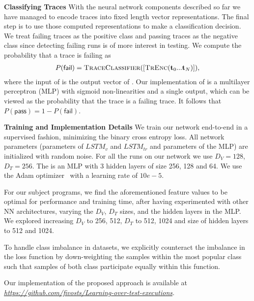 \textbf{Classifying Traces}
With the neural network components described so far we have managed to encode traces into fixed length vector representations. The final step is to use those computed representations to make a classification decision. We treat failing traces as the positive class and passing traces as the negative class since detecting failing runs is of more interest in testing.  We compute the probability that a trace is failing as
\begin{align*}
	P(\textsf{fail}) = \textsc{TraceClassifier}([\textsc{TrEnc}(\mathbf{t}_0 ... \mathbf{t}_N)]),
\end{align*}
where the input of \traceClassifier is the output vector of \traceEncoder. Our implementation of \traceClassifier is a multilayer perceptron (MLP) with sigmoid non-linearities and a single output, which can be viewed as the probability that the trace is a failing trace. It follows that $P(\textsf{pass})=1-P(\textsf{fail})$.

\textbf{Training and Implementation Details}
We train our network end-to-end in a supervised fashion, minimizing the binary cross entropy loss. All network parameters (parameters of $LSTM_v$ and $LSTM_{tr}$ and parameters of the MLP) are initialized with random noise.
For all the runs on our network we use $D_V=128$, $D_T=256$. The \traceClassifier is an MLP with 3 hidden layers of size 256, 128 and 64.
We use the Adam optimizer~\cite{AdamOptimizer} with a learning rate of $10e-5$. 

For our subject programs, we find the aforementioned feature values to be optimal for performance and training time, after having experimented with other NN architectures, varying the $D_V$, $D_T$ sizes, and the hidden layers in the MLP. We explored increasing $D_V$ to 256, 512, $D_T$ to 512, 1024 and size of hidden layers to 512 and 1024.

To handle class imbalance in datasets, 
we explicitly counteract the imbalance in the loss function by down-weighting the samples within the most popular class such that samples of both
class participate equally within this function.

Our implementation of the proposed approach is available at \emph{\url{https://github.com/fivosts/Learning-over-test-executions}. }

